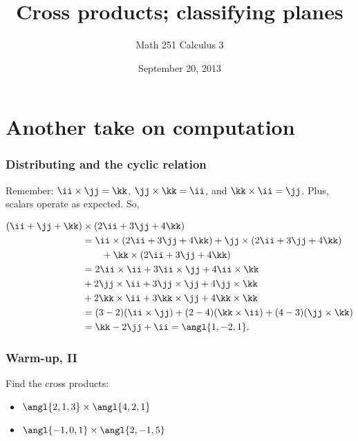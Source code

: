 \documentclass[11pt,ignorenonframetext,]{beamer}
\title{Cross products; classifying planes}
\author{Math 251 Calculus 3}
\date{September 20, 2013 }
\begin{document}
\frame{\titlepage}

\section{Another take on computation}

\begin{frame}\frametitle{Distributing and the cyclic relation}

Remember: $\ii \times \jj = \kk$, $\jj \times \kk = \ii$, and
$\kk \times \ii = \jj$. Plus, scalars operate as expected. So,

\begin{align*}
    (\ii + \jj + \kk) &\times (2 \ii + 3 \jj + 4 \kk) \\
    &= \ii \times (2 \ii + 3 \jj + 4 \kk) + \jj \times (2 \ii + 3 \jj + 4 \kk) \\
    &\qquad + \kk \times (2 \ii + 3 \jj + 4 \kk) \\
    &= 2 \ii \times \ii + 3 \ii \times \jj + 4 \ii \times \kk \\
    &+ 2 \jj \times \ii + 3 \jj \times \jj + 4 \jj \times \kk \\
    &+ 2 \kk \times \ii + 3 \kk \times \jj + 4 \kk \times \kk \\
    &= (3-2)(\ii \times \jj) + (2-4)(\kk \times \ii) + (4-3)(\jj \times \kk) \\
    &= \kk - 2 \jj + \ii = \angl{1, -2, 1}.
\end{align*}

\end{frame}

\begin{frame}\frametitle{Warm-up, II}

Find the cross products:

\begin{itemize}
\itemsep1pt\parskip0pt
\item
  $\angl{2, 1, 3} \times \angl{4, 2, 1}$
\item
  $\angl{-1, 0, 1} \times \angl{2, -1, 5}$
\end{itemize}

\end{frame}
\end{document}
